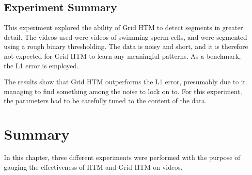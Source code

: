 \subsection{Experiment Summary}
This experiment explored the ability of Grid HTM to detect segments in greater detail. The videos used were videos of swimming sperm cells, and were segmented using a rough binary thresholding. The data is noisy and short, and it is therefore not expected for Grid HTM to learn any meaningful patterns. As a benchmark, the L1 error is employed.
\par
The results show that Grid HTM outperforms the L1 error, presumably due to it managing to find something among the noise to lock on to. For this experiment, the parameters had to be carefully tuned to the content of the data.
\clearpage
\section{Summary}
In this chapter, three different experiments were performed with the purpose of gauging the effectiveness of HTM and Grid HTM on videos.
\par

\par

\par
